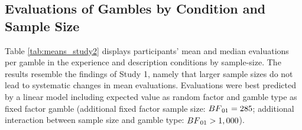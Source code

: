 \documentclass[a4paper, man, floatsintext]{apa6}
\title{}
\author{Jana B. Jarecki}
\date{03 Oktober, 2019}
\begin{document}
\subsection{Evaluations of Gambles by Condition and Sample Size}

Table \ref{tab:means_study2} displays participants' mean and median
evaluations per gamble in the experience and description conditions by
sample-size. The results resemble the findings of Study 1, namely that
larger sample sizes do not lead to systematic changes in mean
evaluations. Evaluations were best predicted by a linear model including
expected value as random factor and gamble type as fixed factor gamble
(additional fixed factor sample size: \(BF\textsubscript{01} = 285\);
additional interaction between sample size and gamble type:
\(BF\textsubscript{01} > 1,000\)).
\end{document}
